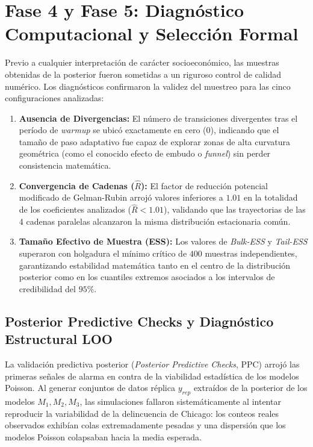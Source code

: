 \documentclass[11pt,a4paper]{article}
\begin{document}
\section{Fase 4 y Fase 5: Diagnóstico Computacional y Selección Formal}
Previo a cualquier interpretación de carácter socioeconómico, las muestras obtenidas de la posterior fueron sometidas a un riguroso control de calidad numérico. Los diagnósticos confirmaron la validez del muestreo para las cinco configuraciones analizadas:
\begin{enumerate}
    \item \textbf{Ausencia de Divergencias:} El número de transiciones divergentes tras el período de \textit{warmup} se ubicó exactamente en cero ($0$), indicando que el tamaño de paso adaptativo fue capaz de explorar zonas de alta curvatura geométrica (como el conocido efecto de embudo o \textit{funnel}) sin perder consistencia matemática.
    \item \textbf{Convergencia de Cadenas ($\hat{R}$):} El factor de reducción potencial modificado de Gelman-Rubin arrojó valores inferiores a $1.01$ en la totalidad de los coeficientes analizados ($\hat{R} < 1.01$), validando que las trayectorias de las 4 cadenas paralelas alcanzaron la misma distribución estacionaria común.
    \item \textbf{Tamaño Efectivo de Muestra (ESS):} Los valores de \textit{Bulk-ESS} y \textit{Tail-ESS} superaron con holgadura el mínimo crítico de $400$ muestras independientes, garantizando estabilidad matemática tanto en el centro de la distribución posterior como en los cuantiles extremos asociados a los intervalos de credibilidad del $95\%$.
\end{enumerate}

\subsection{Posterior Predictive Checks y Diagnóstico Estructural LOO}
La validación predictiva posterior (\textit{Posterior Predictive Checks}, PPC) arrojó las primeras señales de alarma en contra de la viabilidad estadística de los modelos Poisson. Al generar conjuntos de datos réplica $y_{rep}$ extraídos de la posterior de los modelos $M_1, M_2, M_3$, las simulaciones fallaron sistemáticamente al intentar reproducir la variabilidad de la delincuencia de Chicago: los conteos reales observados exhibían colas extremadamente pesadas y una dispersión que los modelos Poisson colapsaban hacia la media esperada.
\end{document}
